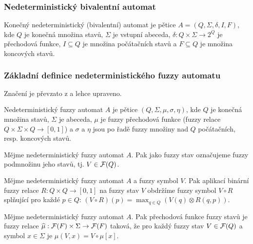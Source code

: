\documentclass[a4paper,10pt]{article}
\begin{document}
\subsubsection*{Nedeterministický bivalentní automat}
\begin{definition}
 Konečný nedeterministický (bivalentní) automat je pětice $A = ( Q, \Sigma, \delta, I, F )$, kde $Q$ je konečná množina stavů, $\Sigma$ je vstupní abeceda, $\delta: Q \times \Sigma \rightarrow 2^Q$ je přechodová funkce, $I \subseteq Q$ je množina počátačních stavů a $F \subseteq Q$ je množina koncových stavů.
\end{definition}


\subsubsection*{Základní definice nedeterministického fuzzy automatu}
Značení je převzato z \cite{AstGonMenGar-FuzzAutEpsMovCmpFuzzMeasBtwStrs} a lehce upraveno.

\begin{definition}\label{def-ZaklDefNedFuzzAut}
 Nedeterministický fuzzy automat $A$ je pětice $(Q, \Sigma, \mu, \sigma, \eta)$, kde $Q$ je konečná množina stavů, $\Sigma$ je abeceda, $\mu$ je fuzzy přechodová funkce (fuzzy relace $Q \times \Sigma \times Q \rightarrow [0, 1]$) a $\sigma$ a $\eta$ jsou po řadě fuzzy množiny nad $Q$ počátačních, resp. koncových stavů.
\end{definition}

\begin{definition}\label{def-FuzzStav}
 Mějme nedeterministický fuzzy automat $A$. Pak jako fuzzy stav označujeme fuzzy podmnožinu jeho stavů, tj. $V \in \mathcal{F}(Q)$.
\end{definition}

\begin{definition}
 Mějme nedeterministický fuzzy automat $A$ a fuzzy symbol $V$. Pak aplikací binární fuzzy relace $R: Q \times Q \rightarrow [0, 1]$ na fuzzy stav $V$ obdržíme fuzzy symbol $V \circ R$ splňující pro každé $p \in Q$: $(V \circ R )(p) = \max_{q \in Q} (V(q) \otimes R(q, p))$.
\end{definition}

\begin{definition}\label{def-PreFunFuzzStav}
 Mějme nedeterministický fuzzy automat $A$. Pak přechodová funkce fuzzy stavů je fuzzy relace $\widehat{\mu}: \mathcal{F}(F) \times \Sigma \rightarrow \mathcal{F}(F)$ taková, že pro každý fuzzy stav $V \in \mathcal{F}(Q)$ a symbol $x \in \Sigma$ je $\widehat{\mu}(V, x) = V \circ \mu[x]$.
\end{definition}
\end{document}
